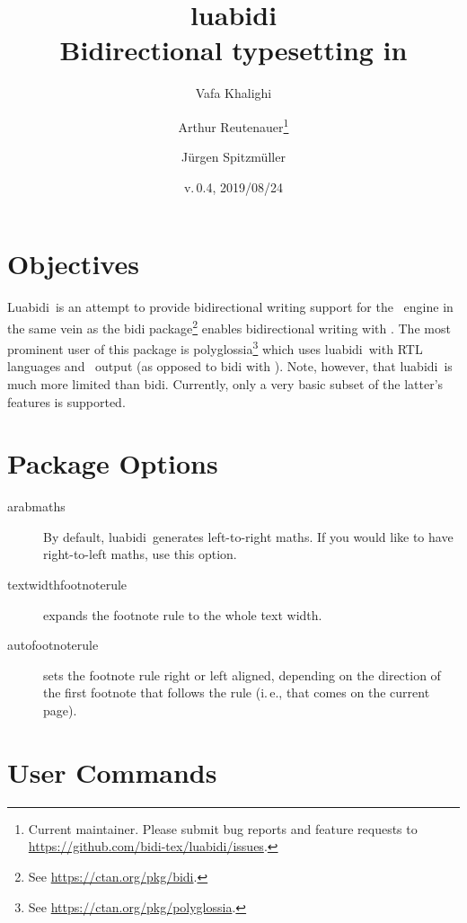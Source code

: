 \documentclass{article}
\newcommand*\lbd{\textsf{luabidi}}
\newcommand*\Lbd{\textsf{Luabidi}}
\def\fileversion{0.4}
\def\filedate{2019/08/24}
\begin{document}
\title{\lbd\\Bidirectional typesetting in \LuaTeX}

\date{v.\,\fileversion, \filedate}

\author{Vafa Khalighi \and Arthur Reutenauer\thanks{%
		Current maintainer. Please submit bug reports and feature requests to \protect\url{https://github.com/bidi-tex/luabidi/issues}.}
	    \and Jürgen Spitzmüller}

\maketitle

\section{Objectives}
\Lbd\ is an attempt to provide bidirectional writing support for the \LuaTeX\ engine in the same vein as the \textsf{bidi} package\footnote{%
See \url{https://ctan.org/pkg/bidi}.} enables bidirectional writing with \XeTeX. The most prominent user of this package is \textsf{polyglossia}\footnote{%
See \url{https://ctan.org/pkg/polyglossia}.} which uses \lbd\ with RTL languages and \LuaTeX\ output (as opposed to \textsf{bidi} with \XeTeX). Note, however, that \lbd\ is much more limited than \textsf{bidi}. Currently, only a very basic
subset of the latter's features is supported.

\section{Package Options}

\begin{description}
	\item[arabmaths] By default, \lbd\ generates left-to-right maths. If you would like to have right-to-left maths, use this option.
	\item[textwidthfootnoterule] expands the footnote rule to the whole text width.
	\item[autofootnoterule] sets the footnote rule right or left aligned, depending on the direction of the first footnote
	that follows the rule (i.\,e., that comes on the current page).
\end{description}

\section{User Commands}
\end{document}
